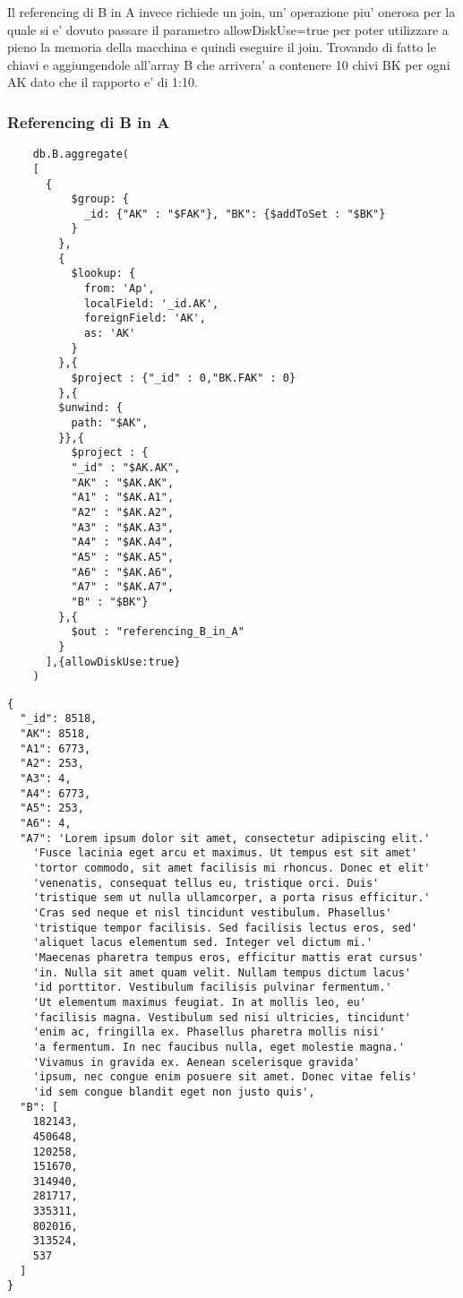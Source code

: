 Il referencing di B in A invece richiede un join, un' operazione piu' onerosa per la quale si e' dovuto passare il parametro allowDiskUse=true per poter utilizzare
a pieno la memoria della macchina e quindi eseguire il join. Trovando di fatto le chiavi e aggiungendole all'array B che arrivera' a contenere 10 chivi BK per ogni 
AK dato che il rapporto e' di 1:10. 

\subsubsection{Referencing di B in A}

\begin{verbatim}
    db.B.aggregate(
    [
      {
          $group: {
            _id: {"AK" : "$FAK"}, "BK": {$addToSet : "$BK"}
          }
        },
        {
          $lookup: {
            from: 'Ap',
            localField: '_id.AK',
            foreignField: 'AK',
            as: 'AK'
          }
        },{
          $project : {"_id" : 0,"BK.FAK" : 0}
        },{
        $unwind: {
          path: "$AK",
        }},{
          $project : {
          "_id" : "$AK.AK",
          "AK" : "$AK.AK",
          "A1" : "$AK.A1", 
          "A2" : "$AK.A2", 
          "A3" : "$AK.A3", 
          "A4" : "$AK.A4",
          "A5" : "$AK.A5",
          "A6" : "$AK.A6",
          "A7" : "$AK.A7",
          "B" : "$BK"} 
        },{
          $out : "referencing_B_in_A"
        }
      ],{allowDiskUse:true}
    )
\end{verbatim} 

\begin{Verbatim}[frame=single,framesep=2mm,label= Referencing di B in A,labelposition=all]
{
  "_id": 8518,
  "AK": 8518,
  "A1": 6773,
  "A2": 253,
  "A3": 4,
  "A4": 6773,
  "A5": 253,
  "A6": 4,
  "A7": 'Lorem ipsum dolor sit amet, consectetur adipiscing elit.' 
    'Fusce lacinia eget arcu et maximus. Ut tempus est sit amet'  
    'tortor commodo, sit amet facilisis mi rhoncus. Donec et elit'
    'venenatis, consequat tellus eu, tristique orci. Duis'
    'tristique sem ut nulla ullamcorper, a porta risus efficitur.'
    'Cras sed neque et nisl tincidunt vestibulum. Phasellus' 
    'tristique tempor facilisis. Sed facilisis lectus eros, sed' 
    'aliquet lacus elementum sed. Integer vel dictum mi.'
    'Maecenas pharetra tempus eros, efficitur mattis erat cursus'
    'in. Nulla sit amet quam velit. Nullam tempus dictum lacus'
    'id porttitor. Vestibulum facilisis pulvinar fermentum.'
    'Ut elementum maximus feugiat. In at mollis leo, eu'
    'facilisis magna. Vestibulum sed nisi ultricies, tincidunt'
    'enim ac, fringilla ex. Phasellus pharetra mollis nisi' 
    'a fermentum. In nec faucibus nulla, eget molestie magna.'
    'Vivamus in gravida ex. Aenean scelerisque gravida'
    'ipsum, nec congue enim posuere sit amet. Donec vitae felis'
    'id sem congue blandit eget non justo quis',
  "B": [
    182143,
    450648,
    120258,
    151670,
    314940,
    281717,
    335311,
    802016,
    313524,
    537
  ]
}
\end{Verbatim}

